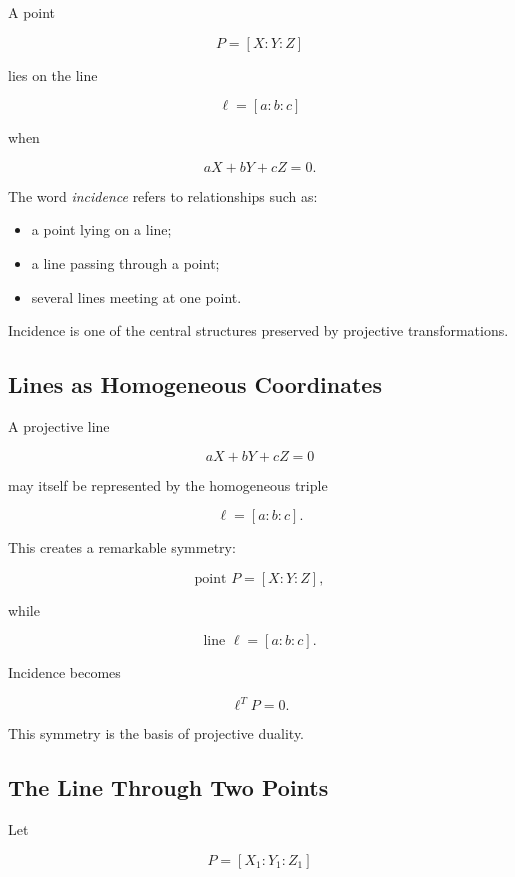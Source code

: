 A point

\[
P=[X:Y:Z]
\]

lies on the line

\[
\ell=[a:b:c]
\]

when

\[
\boxed{
aX+bY+cZ=0.
}
\]

The word \emph{incidence} refers to relationships such as:

\begin{itemize}
    \item a point lying on a line;
    \item a line passing through a point;
    \item several lines meeting at one point.
\end{itemize}

Incidence is one of the central structures preserved by projective
transformations.

\subsection{Lines as Homogeneous Coordinates}
\label{subsec:line-homogeneous-coordinates}

A projective line

\[
aX+bY+cZ=0
\]

may itself be represented by the homogeneous triple

\[
\boxed{\ell=[a:b:c].}
\]

This creates a remarkable symmetry:

\[
\text{point }P=[X:Y:Z],
\]

while

\[
\text{line }\ell=[a:b:c].
\]

Incidence becomes

\[
\boxed{\ell^{T}P=0.}
\]

This symmetry is the basis of projective duality.

\subsection{The Line Through Two Points}
\label{subsec:projective-line-through-points}

Let

\[
P=[X_1:Y_1:Z_1]
\]

